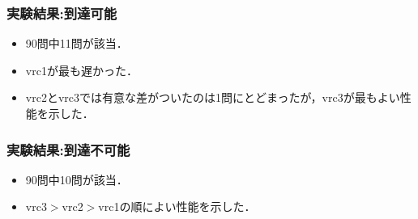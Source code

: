 \documentclass[dvipdfmx,11pt]{beamer}
\begin{document}
\begin{frame}\frametitle{実験結果:到達可能}

  \begin{table}[t]
    \centering
      
  \end{table}

  \begin{itemize}
    \item 90問中11問が該当．
    \item vrc1が最も遅かった．
    \item vrc2とvrc3では有意な差がついたのは1問にとどまったが，vrc3が最もよい性能を示した．
  \end{itemize}
  
\end{frame}


\begin{frame}\frametitle{実験結果:到達不可能}

  \begin{table}[t]
    \centering
      
  \end{table}

  \begin{itemize}
    \item 90問中10問が該当．
    \item vrc3$>$vrc2$>$vrc1の順によい性能を示した．
  \end{itemize}
  
\end{frame}

\end{document}
